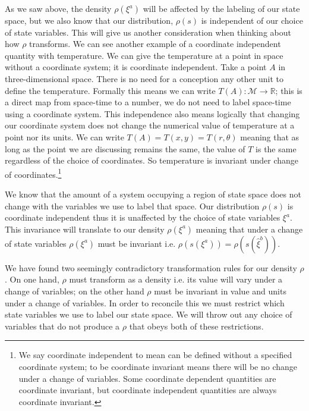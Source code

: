 \documentclass{article}
\begin{document}
	 As we saw above, the density $\rho(\xi^a)$ will be affected by the labeling of our state space, but we also know that our distribution, $\rho(s)$ is independent of our choice of state variables. This will give us another consideration when thinking about how $\rho$ transforms. We can see another example of a coordinate independent quantity with temperature. We can give the temperature at a point in space without a coordinate system; it is coordinate independent. Take a point $A$ in three-dimensional space. There is no need for a conception any other unit to define the temperature. Formally this means we can write $T(A): \mathcal{M} \to \mathbb{R}$; this is a direct map from space-time to a number, we do not need to label space-time using a coordinate system. This independence also means logically that changing our coordinate system does not change the numerical value of temperature at a point nor its units. We can write $T(A) = T(x,y) = T(r,\theta)$ meaning that as long as the point we are discussing remains the same, the value of $T$ is the same regardless of the choice of coordinates. So temperature is invariant under change of coordinates.\footnote{We say coordinate independent to mean can be defined without a specified coordinate system; to be coordinate invariant means there will be no change under a change of variables. Some coordinate dependent quantities are coordinate invariant, but coordinate independent quantities are always coordinate invariant.}
	 
 
	We know that the amount of a system occupying a region of state space does not change with the variables we use to label that space. Our distribution $\rho(s)$ is coordinate independent thus it is unaffected  by the choice of state variables $\xi^a$. This invariance will translate to our density $\rho(\xi^a)$ meaning that under a change of state variables $\rho(\xi^a)$ must be invariant i.e. $\rho(s(\xi^a)) = \rho(s(\hat{\xi}^b))$.
	

	We have found two seemingly contradictory transformation rules for our density $\rho$. On one hand, $\rho$ must transform as a density i.e. its value will vary under a change of variables; on the other hand $\rho$ must be invariant in value and units under a change of variables. In order to reconcile this we must restrict which state variables we use to label our state space. We will throw out any choice of variables that do not produce a $\rho$ that obeys both of these restrictions.
	
\end{document}
